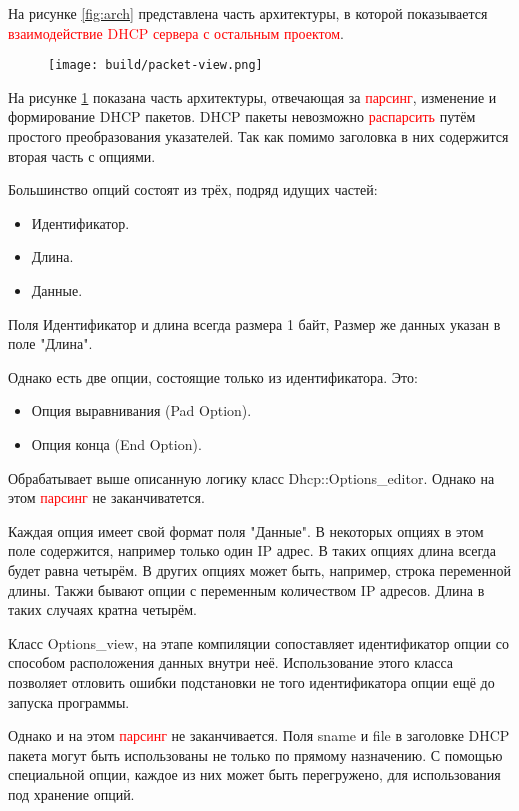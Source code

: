\documentclass[12pt]{article}
\begin{document}
На рисунке \ref{fig:arch} представлена часть архитектуры, в которой показывается \textcolor{red}{взаимодействие DHCP сервера с остальным проектом}.

\begin{figure}[H]
    \texttt{[image: build/packet-view.png]}
    \caption{}
    \label{fig:packet-view}
\end{figure}

На рисунке \ref{fig:packet-view} показана часть архитектуры, отвечающая за \textcolor{red}{парсинг}, изменение и формирование DHCP пакетов. DHCP пакеты невозможно \textcolor{red}{распарсить} путём простого преобразования указателей. Так как помимо заголовка в них содержится вторая часть с опциями.

Большинство опций состоят из трёх, подряд идущих частей:
\begin{itemize}
    \item Идентификатор.
    \item Длина.
    \item Данные.
\end{itemize}
Поля Идентификатор и длина всегда размера 1 байт, Размер же данных указан в поле "Длина".

Однако есть две опции, состоящие только из идентификатора. Это:
\begin{itemize}
    \item Опция выравнивания (Pad Option).
    \item Опция конца (End Option).
\end{itemize}

Обрабатывает выше описанную логику класс Dhcp::Options\_editor. Однако на этом \textcolor{red}{парсинг} не заканчиватется.

Каждая опция имеет свой формат поля "Данные". В некоторых опциях в этом поле содержится, например только один IP адрес. В таких опциях длина всегда будет равна четырём. В других опциях может быть, например, строка переменной длины. Такжи бывают опции с переменным количеством IP адресов. Длина в таких случаях кратна четырём.

Класс Options\_view, на этапе компиляции сопоставляет идентификатор опции со способом расположения данных внутри неё. Использование этого класса позволяет отловить ошибки подстановки не того идентификатора опции ещё до запуска программы.

Однако и на этом \textcolor{red}{парсинг} не заканчивается.
Поля sname и file в заголовке DHCP пакета могут быть использованы не только по прямому назначению. С помощью специальной опции, каждое из них может быть перегружено, для использования под хранение опций.
\end{document}
